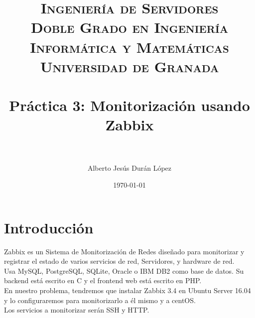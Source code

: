


\title{	
\normalfont \normalsize 
\textsc{\textbf{Ingeniería de Servidores} \\ Doble Grado en Ingeniería Informática y Matemáticas \\ Universidad de Granada} \\ [25pt] %
\horrule{0.5pt} \\[0.4cm] %
\huge Práctica 3: Monitorización usando Zabbix \\ %
\horrule{2pt} \\[0.5cm] %
}

\author{Alberto Jesús Durán López} %

\date{\normalsize\today} %



\maketitle %

\newpage %

\tableofcontents %

\listoffigures

\newpage
\section{Introducción}

Zabbix es un Sistema de Monitorización de Redes diseñado para monitorizar y registrar el estado de varios servicios de red, Servidores, y hardware de red. \\
Usa MySQL, PostgreSQL, SQLite, Oracle o IBM DB2 como base de datos. Su backend está escrito en C y el frontend web está escrito en PHP. \\

En nuestro problema, tendremos que instalar Zabbix 3.4 en Ubuntu Server 16.04 y lo configuraremos para monitorizarlo a él mismo y a centOS. \\ Los servicios a monitorizar serán SSH y HTTP.



